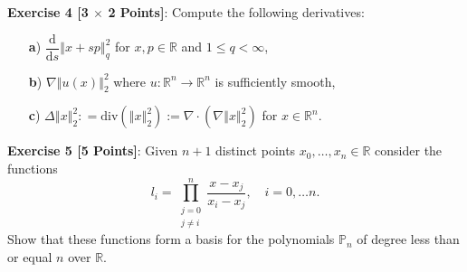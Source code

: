 \documentclass{article}
\begin{document}
\vspace{\baselineskip}
\noindent\textsf{\textbf{Exercise 4 [3 $\boldsymbol{\times}$ 2 Points]}}: Compute the following derivatives:
\begin{itemize}
\item[\textsf{\textbf{a})}] $\dfrac{\mathrm{d}}{\mathrm{d}s} \left\Vert x + sp \right\Vert_q^2$ for $x,p \in\mathbb{R}$ and $1\le q < \infty$,
\item[\textsf{\textbf{b})}] $\nabla \left\Vert u(x) \right\Vert_2^2$ where $u : \mathbb{R}^n \rightarrow \mathbb{R}^n$ is sufficiently smooth,
\item[\textsf{\textbf{c})}] $\Delta \left\Vert x \right\Vert_2^2 : = \mathrm{div} \left( \left\Vert x \right\Vert_2^2\right) := \nabla \cdot \left( \nabla \left\Vert x \right\Vert_2^2 \right) $ for $x \in \mathbb{R}^n$.
\end{itemize} 

\vspace{\baselineskip}
\noindent\textsf{\textbf{Exercise 5 [5 Points]}}: Given $n + 1$ distinct points $x_0, \ldots, x_n \in \mathbb{R}$ consider the functions
\begin{equation}
l_i = \prod \limits_{\substack{j=0\\{}j\ne{}i}}^{n} \dfrac{x-x_j}{x_i - x_j}, \quad i = 0, \ldots n. \nonumber
\end{equation}
Show that these functions form a basis for the polynomials $\mathbb{P}_n$ of degree less than or equal $n$ over $\mathbb{R}$.
\end{document}
